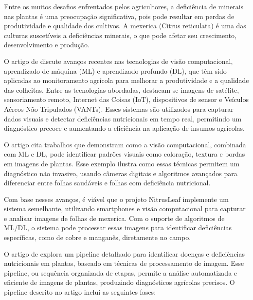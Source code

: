 Entre os muitos desafios enfrentados pelos agricultores, a deficiência de minerais nas plantas é uma preocupação significativa, pois pode resultar em perdas de produtividade e qualidade dos cultivos. A mexerica (Citrus reticulata) é uma das culturas suscetíveis a deficiências minerais, o que pode afetar seu crescimento, desenvolvimento e produção. 

O artigo de \textcite{EstadoArte1} discute avanços recentes nas tecnologias de visão computacional, aprendizado de máquina (ML) e aprendizado profundo (DL), que têm sido aplicadas ao monitoramento agrícola para melhorar a produtividade e a qualidade das colheitas. Entre as tecnologias abordadas, destacam-se imagens de satélite, sensoriamento remoto, Internet das Coisas (IoT), dispositivos de sensor e Veículos Aéreos Não Tripulados (VANTs). Esses sistemas são utilizados para capturar dados visuais e detectar deficiências nutricionais em tempo real, permitindo um diagnóstico precoce e aumentando a eficiência na aplicação de insumos agrícolas.

O artigo cita trabalhos que demonstram como a visão computacional, combinada com ML e DL, pode identificar padrões visuais como coloração, textura e bordas em imagens de plantas. Esse exemplo ilustra como essas técnicas permitem um diagnóstico não invasivo, usando câmeras digitais e algoritmos avançados para diferenciar entre folhas saudáveis e folhas com deficiência nutricional.

Com base nesses avanços, é viável que o projeto NitrusLeaf implemente um sistema semelhante, utilizando smartphones e visão computacional para capturar e analisar imagens de folhas de mexerica. Com o suporte de algoritmos de ML/DL, o sistema pode processar essas imagens para identificar deficiências específicas, como de cobre e manganês, diretamente no campo.

O artigo de \cite{EstadoArte2} explora um pipeline detalhado  para identificar doenças e deficiências nutricionais em plantas, baseado em técnicas de processamento de imagem. Esse pipeline, ou sequência organizada de etapas, permite a análise automatizada e eficiente de imagens de plantas, produzindo diagnósticos agrícolas precisos. O pipeline descrito no artigo inclui as seguintes fases:

